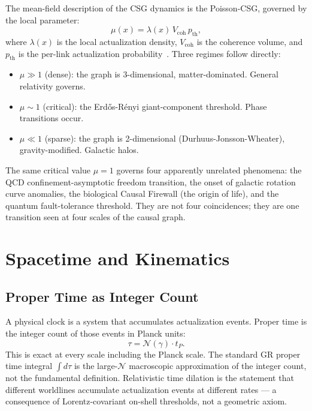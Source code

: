 \documentclass[11pt,a4paper]{article}
\begin{document}
The mean-field description of the CSG dynamics is the Poisson-CSG, governed
by the local parameter:
\begin{equation}
  \mu(x) = \lambda(x)\,V_{\mathrm{coh}}\,p_{\mathrm{th}},
  \label{eq:mu}
\end{equation}
where $\lambda(x)$ is the local actualization density, $V_{\mathrm{coh}}$
is the coherence volume, and $p_{\mathrm{th}}$ is the per-link actualization
probability~\citep{Sandeman2026RAQI}. Three regimes follow directly:

\begin{itemize}[noitemsep]
  \item $\mu \gg 1$ (dense): the graph is 3-dimensional, matter-dominated.
  General relativity governs.
  \item $\mu \sim 1$ (critical): the Erd\H{o}s-R\'{e}nyi giant-component
  threshold. Phase transitions occur.
  \item $\mu \ll 1$ (sparse): the graph is 2-dimensional
  (Durhuus-Jonsson-Wheater), gravity-modified. Galactic halos.
\end{itemize}

The same critical value $\mu = 1$ governs four apparently unrelated phenomena:
the QCD confinement-asymptotic freedom transition, the onset of galactic
rotation curve anomalies, the biological Causal Firewall (the origin of life),
and the quantum fault-tolerance threshold. They are not four coincidences;
they are one transition seen at four scales of the causal graph.

\section{Spacetime and Kinematics}
\label{sec:spacetime}

\subsection{Proper Time as Integer Count}

A physical clock is a system that accumulates actualization events.
Proper time is the integer count of those events in Planck units:
\begin{equation}
  \tau = \mathcal{N}(\gamma) \cdot t_P.
  \label{eq:proper_time}
\end{equation}
This is exact at every scale including the Planck scale. The standard
GR proper time integral $\int d\tau$ is the large-$\mathcal{N}$ macroscopic
approximation of the integer count, not the fundamental definition.
Relativistic time dilation is the statement that different worldlines
accumulate actualization events at different rates — a consequence of
Lorentz-covariant on-shell thresholds, not a geometric axiom.
\end{document}

